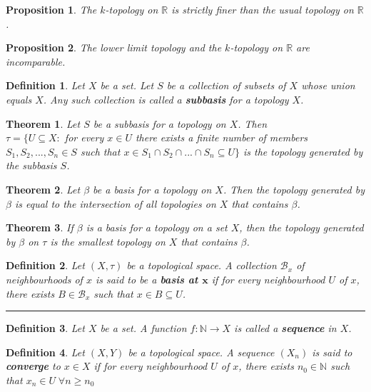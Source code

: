 \documentclass[14pt,twoside]{extreport}
\newcommand{\hhrule}{\vspace{1cm}\hrule\vspace{1cm}}
\theoremstyle{dotless}
\newtheorem*{defn}{Definition}
\newtheorem*{thm}{Theorem} %
\newtheorem*{prop}{Proposition} %
\begin{document}
\begin{prop}
    The $k$-topology on $\mathbb{R}$ is strictly finer than the usual topology on $\mathbb{R}$.
\end{prop}

\begin{prop}
    The lower limit topology and the $k$-topology on $\mathbb{R}$ are incomparable.
\end{prop}


\begin{defn}
    Let $X$ be a set. Let $S$ be a collection of subsets of $X$ whose union equals $X$. Any such collection is called a \textbf{subbasis} for a topology $X$.
\end{defn}

\begin{thm}
    Let $S$ be a subbasis for a topology on $X$. Then
    \\ $\tau = \{ U \subseteq X  :  $ for every $ x \in U $ there exists a finite number of members $ S_1, S_2, ..., S_n \in S $ such that $ x \in S_1 \cap S_2 \cap ... \cap S_n \subseteq U \}$ is the topology generated by the subbasis $S$.
\end{thm}

\begin{thm}
    Let $\beta$ be a basis for a topology on $X$. Then the topology generated by $\beta$ is equal to the intersection of all topologies on $X$ that contains $\beta$.
\end{thm}

\begin{thm}
    If $\beta$ is a basis for a topology on a set $X$, then the topology generated by $\beta$ on $\tau$ is the smallest topology on $X$ that contains $\beta$.
\end{thm}

\begin{defn}
    Let $(X, \tau)$ be a topological space.
    A collection $\mathscr{B}_x$ of neighbourhoods of $x$ is said to be a \textbf{basis at $\bm{x}$} if for every neighbourhood $U$ of $x$, there exists $B \in \mathscr{B}_x$ such that $x \in B \subseteq U$.
\end{defn}

\hhrule

\begin{defn}
    Let $X$ be a set. A function $f \colon \mathbb{N} \to X$ is called a \textbf{sequence} in $X$.
\end{defn}

\begin{defn}
    Let $\left (X, Y\right )$ be a topological space. A sequence $\left (X_n\right )$ is said to \textbf{converge} to $x \in X$ if for every neighbourhood $U$ of $x$, there exists $n_0 \in \mathbb{N}$ such that $x_n \in U \;\forall n \geq n_0$
\end{defn}
\end{document}
